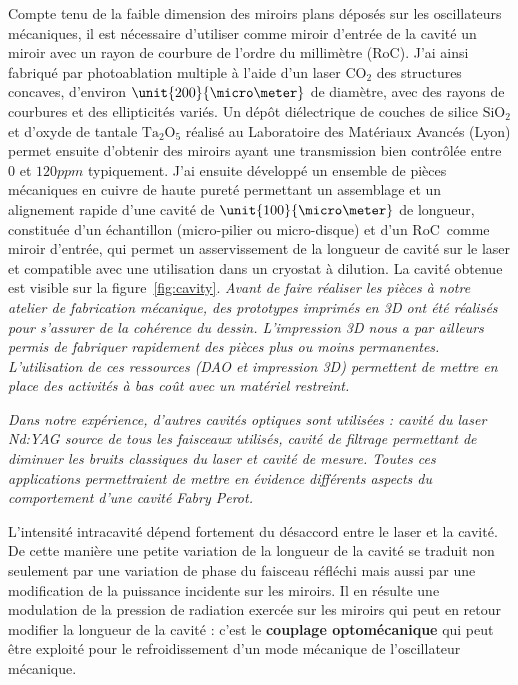 \documentclass[12pt,a4paper]{article}
\newcommand{\uroc}{\micro RoC}
\begin{document}
Compte tenu de la faible dimension des miroirs plans déposés sur les oscillateurs mécaniques, il est nécessaire d'utiliser comme miroir d'entrée de la cavité un miroir avec un rayon de courbure de l'ordre du millimètre (\uroc).
J'ai ainsi fabriqué par photoablation multiple à l'aide d'un laser $\mathrm{CO_2}$ des structures concaves, d'environ $\unit{200}{\micro\meter}$ de diamètre, avec des rayons de courbures et des ellipticités variés.
Un dépôt diélectrique de couches de silice $\mathrm{SiO_2}$ et d'oxyde de tantale $\mathrm{Ta_2O_5}$ réalisé au Laboratoire des Matériaux Avancés (Lyon) permet ensuite d'obtenir des miroirs ayant une transmission bien contrôlée entre 0 et $\unit{120}{ppm}$ typiquement.
J'ai ensuite développé un ensemble de pièces mécaniques en cuivre de haute pureté permettant un assemblage et un alignement rapide d'une cavité de $\unit{100}{\micro\meter}$ de longueur, constituée d'un échantillon (micro-pilier ou micro-disque) et d'un \uroc\ comme miroir d'entrée, qui permet un asservissement de la longueur de cavité sur le laser et compatible avec une utilisation dans un cryostat à dilution.
La cavité obtenue est visible sur la figure~\ref{fig:cavity}.
\textit{Avant de faire réaliser les pièces à notre atelier de fabrication mécanique, des prototypes imprimés en 3D ont été réalisés pour s'assurer de la cohérence du dessin.
L'impression 3D nous a par ailleurs permis de fabriquer rapidement des pièces plus ou moins permanentes.
L'utilisation de ces ressources (DAO et impression 3D) permettent de mettre en place des activités à bas coût avec un matériel restreint.}

\textit{Dans notre expérience, d'autres cavités optiques sont utilisées : cavité du laser Nd\string:YAG source de tous les faisceaux utilisés, cavité de filtrage permettant de diminuer les bruits classiques du laser et cavité de mesure.
Toutes ces applications permettraient de mettre en évidence différents aspects du comportement d'une cavité Fabry Perot.}

L'intensité intracavité dépend fortement du désaccord entre le laser et la cavité.
De cette manière une petite variation de la longueur de la cavité se traduit non seulement par une variation de phase du faisceau réfléchi mais aussi par une modification de la puissance incidente sur les miroirs.
Il en résulte une modulation de la pression de radiation exercée sur les miroirs qui peut en retour modifier la longueur de la cavité : c'est le \textbf{couplage optomécanique} qui peut être exploité pour le refroidissement d'un mode mécanique de l'oscillateur mécanique.
\end{document}
